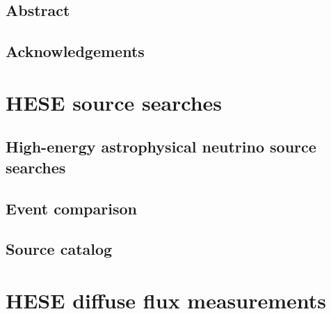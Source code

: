 \documentclass[oneside, letterpaper, 10pt, oldfontcommands]{memoir}
\begin{document}
\frontmatter

\thetitlepage
\cleardoublepage
\setcounter{page}{1}

\section{Abstract}
\uwabstract
\cleardoublepage

\section{Acknowledgements}


\clearpage
\tableofcontents\clearpage

\mainmatter













\clearpage
\newpage
\appendix

\begingroup
\graphicspath{{results/HESE_Final_Paper/}}
\chapter{HESE source searches}
\section{High-energy astrophysical neutrino source searches\label{sec:sources}}

\section{Event comparison\label{sec:comparison}}

\section{Source catalog\label{sec:source_catalog}}

\chapter{HESE diffuse flux measurements}
\end{document}
